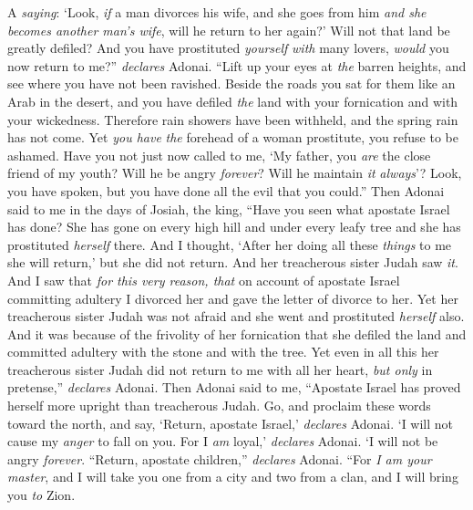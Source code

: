 \begin{biblechapter} %
\verse A \textit{saying}: ‘Look, \textit{if} a man divorces his wife, 
and she goes from him \textit{and she becomes another man’s wife}, 
will he return to her again?’ 
Will not that land be greatly defiled? 
And you have prostituted \textit{yourself} \textit{with} many lovers, 
\textit{would} you now return to me?” \textit{declares} Adonai.
\verse “Lift up your eyes at \textit{the} barren heights, 
and see where you have not been ravished. 
Beside the roads you sat for them like an Arab in the desert, 
and you have defiled \textit{the} land 
with your fornication 
and with your wickedness.
\verse Therefore rain showers have been withheld, 
and the spring rain has not come. 
Yet \textit{you have} \textit{the} forehead of a woman prostitute, 
you refuse to be ashamed.
\verse Have you not just now called to me, 
‘My father, you \textit{are} the close friend of my youth?
\verse Will he be angry \textit{forever}? 
Will he maintain \textit{it} \textit{always}’? 
Look, you have spoken, 
but you have done all the evil that you could.”
 Then Adonai said to me in the days of Josiah, the king, “Have you seen what apostate Israel has done? She has gone on every high hill and under every leafy tree and she has prostituted \textit{herself} there.
\verse And I thought, ‘After her doing all these \textit{things} to me she will return,’ but she did not return. And her treacherous sister Judah saw \textit{it}.
\verse And I saw that \textit{for this very reason, that} on account of apostate Israel committing adultery I divorced her and gave the letter of divorce to her. Yet her treacherous sister Judah was not afraid and she went and prostituted \textit{herself} also.
\verse And it was because of the frivolity of her fornication that she defiled the land and committed adultery with the stone and with the tree.
\verse Yet even in all this her treacherous sister Judah did not return to me with all her heart, \textit{but only} in pretense,” \textit{declares} Adonai.
 Then Adonai said to me, “Apostate Israel has proved herself more upright than treacherous Judah.
\verse Go, and proclaim these words toward the north, and say,
\verse ‘Return, apostate Israel,’ \textit{declares} Adonai. 
‘I will not cause my \textit{anger} to fall on you. 
For I \textit{am} loyal,’ \textit{declares} Adonai. 
‘I will not be angry \textit{forever}.
\verse “Return, apostate children,” \textit{declares} Adonai. “For \textit{I am your master}, and I will take you one from a city and two from a clan, and I will bring you \textit{to} Zion.

\end{biblechapter}
